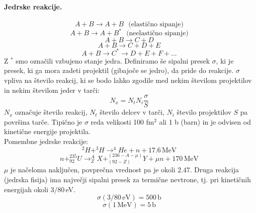 \documentclass[a4paper]{article}
\begin{document}
\paragraph{Jedrske reakcije.} $$A + B \to A + B~~~\text{(elastično sipanje)}$$
$$A + B \to A + B^*~~~\text{(neelastično sipanje)}$$
$$A + B \to C + D$$
$$A + B \to C + D + E$$
$$A + B \to C^* \to D + E + F + ...$$
Z $^*$ smo označili vzbujeno stanje jedra. Definiramo še sipalni presek $\sigma$, ki je presek, ki ga mora zadeti projektil (gibajoče se jedro), da pride do reakcije.
$\sigma$ vpliva na število reakcij, ki se bodo lahko zgodile med nekim številom projektilov in nekim številom jeder v tarči:
$$N_x = N_tN_i\frac{\sigma}{S}$$
$N_x$ označuje število reakcij, $N_t$ število delcev v tarči, $N_i$ število projektilov $S$ pa površina tarče. Tipično je $\sigma$ reda velikosti 100 fm$^2$ ali 1 b (barn) in je odvisen od kinetične energije projektila. \\
Pomembne jedrske reakcije:
$$^2H + ^3H \to ^4He + n + 17.6\,\mathrm{MeV}$$
$$n + ^{235}_{92}U \to ^A_ZX + ^{(236 - A - \mu)}_{(92-Z)}Y + \mu n + 170\,\mathrm{MeV}$$
$\mu$ je načeloma naključen, povprečna vrednost pa je okoli $2.47$.
Druga reakcija (jedrska fisija) ima največji sipalni presek za termične nevtrone, tj. pri kinetičnih energijah okoli $3/80$\,eV.
$$\sigma(3/80\,\mathrm{eV}) = 500\,\mathrm{b}$$
$$\sigma(1\,\mathrm{MeV}) = 5\,\mathrm{b}$$
\end{document}
